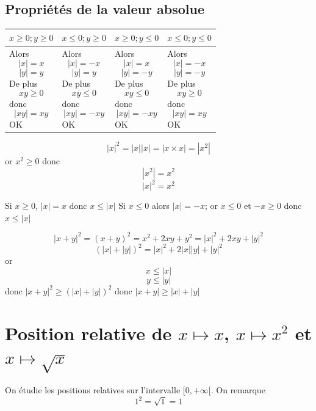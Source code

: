 \subsection{Propriétés de la valeur absolue}
\newline

\begin{preuve}
\begin{tabularx}{\linewidth}{| X | X | X | X |}
\hline
$x \geq 0; y \geq 0$ & $x \leq 0; y \geq 0$ & $x \geq 0; y \leq 0$ & $x \leq 0; y \leq 0$ \\ \hline
Alors $$|x| = x$$ $$|y| = y$$ De plus $$xy \geq 0$$ donc $$|xy| = xy$$ OK & Alors $$|x| = -x$$ $$|y| = y$$ De plus $$xy \leq 0$$ donc $$|xy| = -xy$$ OK & Alors $$|x| = x$$ $$|y| = -y$$ De plus $$xy \leq 0$$ donc $$|xy| = -xy$$ OK & Alors $$|x| = -x$$ $$|y| = -y$$ De plus $$xy \geq 0$$ donc $$|xy| = xy$$ OK\\ \hline
\end{tabularx}
\end{preuve}
\newline


\begin{preuve}
$$|x|^2 = |x||x| = |x\times x| = |x^2|$$ or $x^2 \geq 0$ donc $$|x^2| = x^2$$ $$|x|^2 = x^2$$
\end{preuve}

\newline


\begin{preuve}
Si $x\geq0$, $|x| = x$ donc $x \leq |x|$\newline
Si $x \leq 0$ alors $|x| = -x$; or $x \leq 0$ et $-x \geq 0$ donc $x\leq |x|$
\end{preuve}
\newline

\begin{preuve}
$$|x+y|^2 = (x+y)^2 = x^2 + 2xy + y^2 = |x|^2 + 2xy + |y|^2$$
$$(|x| + |y|)^2 = |x|^2 + 2|x||y| + |y|^2$$
or 
$$x \leq |x|$$
$$y \leq |y|$$
donc $|x+y|^2 \geq (|x| + |y|)^2$ donc $|x+y| \geq |x| + |y|$
\end{preuve}
\section{Position relative de $x\mapsto x$, $x\mapsto x^2$ et $x\mapsto \sqrt{x}$}
On étudie les positions relatives sur l'intervalle $[0,+\infty[$. On remarque 
$$1^2 = \sqrt{1} = 1$$
